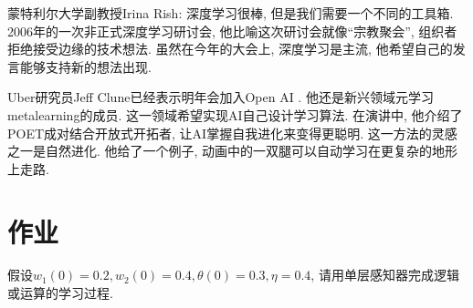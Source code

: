 蒙特利尔大学副教授Irina Rish: 深度学习很棒, 但是我们需要一个不同的工具箱.
2006年的一次非正式深度学习研讨会, 他比喻这次研讨会就像“宗教聚会”, 组织者拒绝接受边缘的技术想法.
虽然在今年的大会上, 深度学习是主流, 他希望自己的发言能够支持新的想法出现.

Uber研究员Jeff Clune已经表示明年会加入Open AI . 他还是新兴领域元学习metalearning的成员. 这一领域希望实现AI自己设计学习算法.
在演讲中, 他介绍了POET成对结合开放式开拓者, 让AI掌握自我进化来变得更聪明. 这一方法的灵感之一是自然进化. 他给了一个例子, 动画中的一双腿可以自动学习在更复杂的地形上走路.
\section{作业}
\begin{think}
假设$w_1(0)=0.2, w_2(0)=0.4, \theta(0)=0.3, \eta=0.4$, 请用单层感知器完成逻辑或运算的学习过程.
\end{think}
